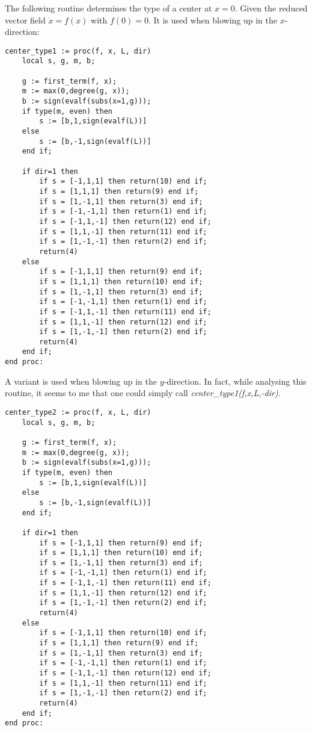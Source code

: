 \documentclass[a4paper,10pt]{article}
\begin{document}
The following routine determines the type of a center at $x=0$.  Given the reduced vector field $\dot{x}=f(x)$
with $f(0)=0$.  It is used when blowing up in the $x$-direction:

\begin{lstlisting}[name=blowup]
center_type1 := proc(f, x, L, dir)
    local s, g, m, b;

    g := first_term(f, x);
    m := max(0,degree(g, x));
    b := sign(evalf(subs(x=1,g)));
    if type(m, even) then
        s := [b,1,sign(evalf(L))]
    else
        s := [b,-1,sign(evalf(L))]
    end if;

    if dir=1 then
        if s = [-1,1,1] then return(10) end if;
        if s = [1,1,1] then return(9) end if;
        if s = [1,-1,1] then return(3) end if;
        if s = [-1,-1,1] then return(1) end if;
        if s = [-1,1,-1] then return(12) end if;
        if s = [1,1,-1] then return(11) end if;
        if s = [1,-1,-1] then return(2) end if;
        return(4)
    else
        if s = [-1,1,1] then return(9) end if;
        if s = [1,1,1] then return(10) end if;
        if s = [1,-1,1] then return(3) end if;
        if s = [-1,-1,1] then return(1) end if;
        if s = [-1,1,-1] then return(11) end if;
        if s = [1,1,-1] then return(12) end if;
        if s = [1,-1,-1] then return(2) end if;
        return(4)
    end if;
end proc:
\end{lstlisting}


A variant is used when blowing up in the $y$-direction.  In fact, while analysing this routine, it
seems to me that one could simply call {\slshape center\_type1(f,x,L,-dir)}.

\begin{lstlisting}[name=blowup]
center_type2 := proc(f, x, L, dir)
    local s, g, m, b;

    g := first_term(f, x);
    m := max(0,degree(g, x));
    b := sign(evalf(subs(x=1,g)));
    if type(m, even) then
        s := [b,1,sign(evalf(L))]
    else
        s := [b,-1,sign(evalf(L))]
    end if;

    if dir=1 then
        if s = [-1,1,1] then return(9) end if;
        if s = [1,1,1] then return(10) end if;
        if s = [1,-1,1] then return(3) end if;
        if s = [-1,-1,1] then return(1) end if;
        if s = [-1,1,-1] then return(11) end if;
        if s = [1,1,-1] then return(12) end if;
        if s = [1,-1,-1] then return(2) end if;
        return(4)
    else
        if s = [-1,1,1] then return(10) end if;
        if s = [1,1,1] then return(9) end if;
        if s = [1,-1,1] then return(3) end if;
        if s = [-1,-1,1] then return(1) end if;
        if s = [-1,1,-1] then return(12) end if;
        if s = [1,1,-1] then return(11) end if;
        if s = [1,-1,-1] then return(2) end if;
        return(4)
    end if;
end proc:
\end{lstlisting}
\end{document}
